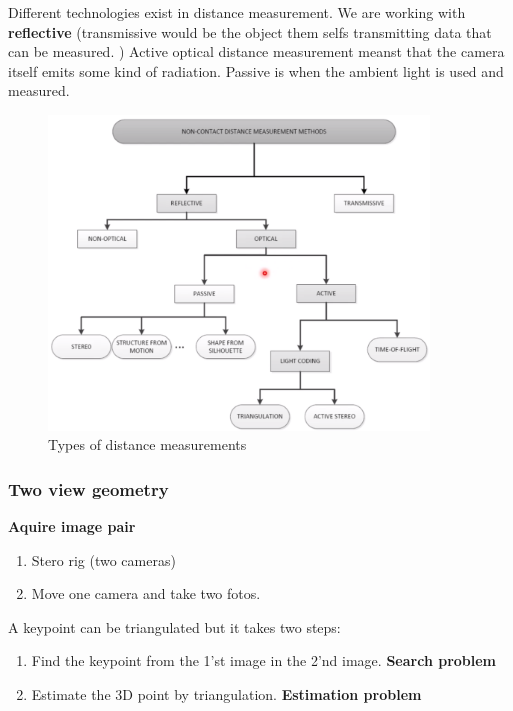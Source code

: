 \documentclass[a4paper]{article}
\begin{document}
Different technologies exist in distance measurement. We are working with \textbf{reflective} (transmissive would be the object them selfs transmitting data that can be measured. ) Active optical distance measurement meanst that the camera itself emits some kind of radiation. Passive is when the ambient light is used and measured. 
\begin{figure}[H]
\centering
\includegraphics[width=0.9\textwidth]{figures/Types_of_distance_measurements.png}
\caption{Types of distance measurements}
\label{fig:types_of_distance_measurements}
\end{figure} 


\subsubsection{Two view geometry}
\textbf{Aquire image pair} 
\begin{enumerate}
	\item Stero rig (two cameras)
	\item Move one camera and take two fotos.
\end{enumerate}
\vspace{5pt}

A keypoint can be triangulated but it takes two steps:
\begin{enumerate}
	\item Find the keypoint from the 1'st image in the 2'nd image. \textbf{Search problem} 
	\item Estimate the 3D point by triangulation. \textbf{Estimation problem} 
\end{enumerate}
\end{document}
